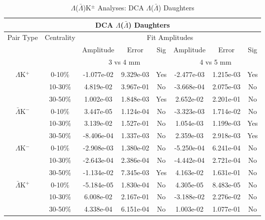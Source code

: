 \documentclass[../AnalysisNoteJBuxton.tex]{subfiles}
\begin{document}
\begin{table}
 \centering
 \begin{tabular}{|c|c|c|c|c||c|c|c|}
  \multicolumn{8}{c}{DCA $\Lambda$($\bar{\Lambda}$) Daughters} \\
  \hline
  \multirow{3}{*}{Pair Type} & \multirow{3}{*}{Centrality} & \multicolumn{6}{c|}{Fit Amplitudes} \\
  \cline{3-8}
   & & Amplitude & Error & Sig & Amplitude & Error & Sig \\  
  \cline{3-8}
   & & \multicolumn{3}{c||}{3 vs 4 mm} & \multicolumn{3}{c|}{4 vs 5 mm} \\  
  \hline
  \multirow{3}{*}{$\Lambda$K$^{+}$}
   &  0-10\% & -1.077e-02 & 9.329e-03 & Yes & -2.477e-03 & 1.215e-03 & Yes \\
   & 10-30\% & 4.819e-02 & 3.967e-01 & No & -3.668e-04 & 2.075e-03 & No \\
   & 30-50\% & 1.002e-03 & 1.848e-03 & Yes & 2.652e-02 & 2.201e-01 & No \\
  \hline
  \multirow{3}{*}{$\bar{\Lambda}$K$^{-}$}
   &  0-10\% & 3.447e-05 & 1.124e-04 & No & -3.323e-03 & 1.714e-02 & No \\
   & 10-30\% & 3.139e-02 & 1.527e-01 & No & 1.054e-03 & 1.199e-03 & Yes \\
   & 30-50\% & -8.406e-04 & 1.337e-03 & No & 2.359e-03 & 2.918e-03 & Yes \\
  \hline \hline
  \multirow{3}{*}{$\Lambda$K$^{-}$}
   &  0-10\% & -2.908e-03 & 1.380e-02 & No & -5.250e-04 & 6.241e-04 & No \\
   & 10-30\% & -2.643e-04 & 2.386e-04 & No & -4.442e-04 & 2.721e-04 & No \\
   & 30-50\% & -1.134e-02 & 7.345e-03 & Yes & 4.163e-02 & 1.631e-01 & No \\
  \hline
  \multirow{3}{*}{$\bar{\Lambda}$K$^{+}$}
   &  0-10\% & -5.184e-05 & 1.830e-04 & No & 4.305e-05 & 8.483e-05 & No \\
   & 10-30\% & 6.008e-02 & 2.167e-01 & No & -3.188e-02 & 2.276e-02 & No \\
   & 30-50\% & 4.338e-04 & 6.151e-04 & No & 1.003e-02 & 1.077e-01 & No \\
  \hline
 \end{tabular}
 \caption{$\Lambda$($\bar{\Lambda}$)K$^{\pm}$ Analyses: DCA $\Lambda$($\bar{\Lambda}$) Daughters}
 \label{tab:LamDaughtersDcaLamKch}
\end{table}
\end{document}
